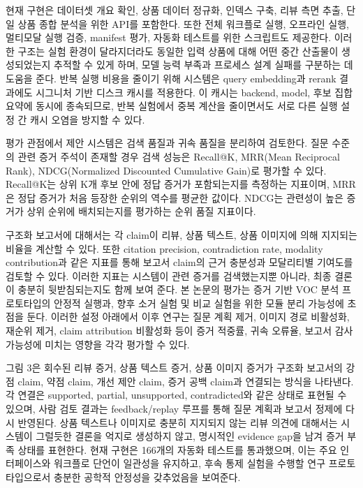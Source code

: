 \documentclass[11pt]{article}
\begin{document}
현재 구현은 데이터셋 개요 확인, 상품 데이터 정규화, 인덱스 구축, 리뷰 측면 추출, 단일 상품 종합 분석을 위한 API를 포함한다. 또한 전체 워크플로 실행, 오프라인 실행, 멀티모달 실행 검증, manifest 평가, 자동화 테스트를 위한 스크립트도 제공한다. 이러한 구조는 실험 환경이 달라지더라도 동일한 입력 상품에 대해 어떤 중간 산출물이 생성되었는지 추적할 수 있게 하며, 모델 능력 부족과 프로세스 설계 실패를 구분하는 데 도움을 준다. 반복 실행 비용을 줄이기 위해 시스템은 query embedding과 rerank 결과에도 시그니처 기반 디스크 캐시를 적용한다. 이 캐시는 backend, model, 후보 집합 요약에 동시에 종속되므로, 반복 실험에서 중복 계산을 줄이면서도 서로 다른 실행 설정 간 캐시 오염을 방지할 수 있다.

평가 관점에서 제안 시스템은 검색 품질과 귀속 품질을 분리하여 검토한다. 질문 수준의 관련 증거 주석이 존재할 경우 검색 성능은 Recall@K, MRR(Mean Reciprocal Rank), NDCG(Normalized Discounted Cumulative Gain)로 평가할 수 있다\citep{geng2023grammarConstrainedDecoding}. Recall@K는 상위 K개 후보 안에 정답 증거가 포함되는지를 측정하는 지표이며, MRR은 정답 증거가 처음 등장한 순위의 역수를 평균한 값이다. NDCG는 관련성이 높은 증거가 상위 순위에 배치되는지를 평가하는 순위 품질 지표이다.

구조화 보고서에 대해서는 각 claim이 리뷰, 상품 텍스트, 상품 이미지에 의해 지지되는 비율을 계산할 수 있다. 또한 citation precision, contradiction rate, modality contribution과 같은 지표를 통해 보고서 claim의 근거 충분성과 모달리티별 기여도를 검토할 수 있다. 이러한 지표는 시스템이 관련 증거를 검색했는지뿐 아니라, 최종 결론이 충분히 뒷받침되는지도 함께 보여 준다. 본 논문의 평가는 증거 기반 VOC 분석 프로토타입의 안정적 실행과, 향후 소거 실험 및 비교 실험을 위한 모듈 분리 가능성에 초점을 둔다. 이러한 설정 아래에서 이후 연구는 질문 계획 제거, 이미지 경로 비활성화, 재순위 제거, claim attribution 비활성화 등이 증거 적중률, 귀속 오류율, 보고서 감사 가능성에 미치는 영향을 각각 평가할 수 있다.

그림 3은 회수된 리뷰 증거, 상품 텍스트 증거, 상품 이미지 증거가 구조화 보고서의 강점 claim, 약점 claim, 개선 제안 claim, 증거 공백 claim과 연결되는 방식을 나타낸다. 각 연결은 supported, partial, unsupported, contradicted와 같은 상태로 표현될 수 있으며, 사람 검토 결과는 feedback/replay 루프를 통해 질문 계획과 보고서 정제에 다시 반영된다. 상품 텍스트나 이미지로 충분히 지지되지 않는 리뷰 의견에 대해서는 시스템이 그럴듯한 결론을 억지로 생성하지 않고, 명시적인 evidence gap을 남겨 증거 부족 상태를 표현한다. 현재 구현은 166개의 자동화 테스트를 통과했으며, 이는 주요 인터페이스와 워크플로 단언이 일관성을 유지하고, 후속 통제 실험을 수행할 연구 프로토타입으로서 충분한 공학적 안정성을 갖추었음을 보여준다.
\end{document}
